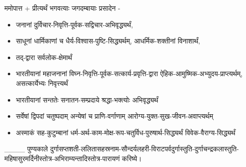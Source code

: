 \setcounter{page}{0}
\sectionmark{\mbox{}}
\renewcommand{\chaptermark}[1]{%
\markboth{\large #1}{}}
\begin{center}
\label{sec:start}

ममोपात्त + प्रीत्यर्थं भगवत्याः जगदम्बायाः प्रसादेन -
\begin{itemize}\addtolength{\itemsep}{-1ex}
\item जनानां दुर्विचार-निवृत्ति-पूर्वक-सद्विचार-अभिवृद्ध्यर्थं,
\item साधूनां धार्मिकाणां च धैर्य-विश्वास-पुष्टि-सिद्ध्यर्थम्, आधर्मिक-शक्तीनां विनाशार्थं,
\item तद्-द्वारा सर्वलोक-क्षेमार्थं

\item भारतीयानां महाजनानां विघ्न-निवृत्ति-पूर्वक-सत्कार्य-प्रवृत्ति-द्वारा ऐहिक-आमुष्मिक-अभ्युदय-प्राप्त्यर्थम्, असत्कार्येभ्यः निवृत्त्यर्थं

\item भारतीयानां सन्ततेः सनातन-सम्प्रदाये श्रद्धा-भक्त्योः अभिवृद्ध्यर्थं

\item सर्वेषां द्विपदां चतुष्पदाम् अन्येषां च प्राणि-वर्गाणाम् आरोग्य-युक्त-सुख-जीवन-अवाप्त्यर्थम्

\item अस्माकं सह-कुटुम्बानां धर्म-अर्थ-काम-मोक्ष-रूप-चतुर्विध-पुरुषार्थ-सिद्ध्यर्थं विवेक-वैराग्य-सिद्ध्यर्थं
\end{itemize}
\_\_\_\_ पुण्यकाले
दुर्गासप्तशती-ललितासहस्रनाम-सौन्दर्यलहरी-विराटपर्वदुर्गास्तुति-दुर्गाचन्द्रकलास्तुति-महिषासुरमर्दिनीस्तोत्र-अभिराम्यन्तादिस्तोत्र-पारायणं करिष्ये।










\hyperref[sec:start]{\closesection}





\closesection
\end{center}
